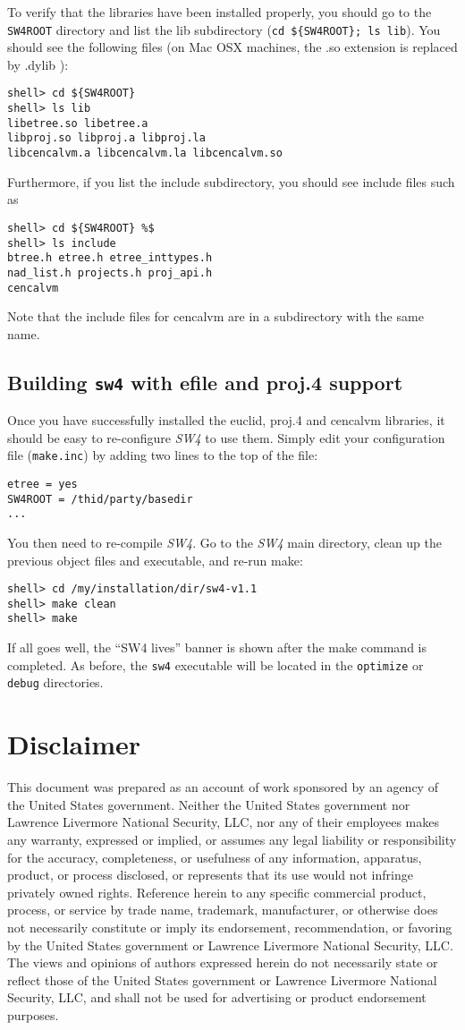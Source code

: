 \documentclass[11pt]{article}
\begin{document}
To verify that the libraries have been installed properly, you should go to the \verb+SW4ROOT+ directory
and list the lib subdirectory (\verb+cd ${SW4ROOT}; ls lib+). You should see the following files (on
Mac OSX machines, the .so extension is replaced by .dylib ):
\begin{verbatim}
shell> cd ${SW4ROOT}
shell> ls lib
libetree.so libetree.a 
libproj.so libproj.a libproj.la 
libcencalvm.a libcencalvm.la libcencalvm.so 
\end{verbatim}
Furthermore, if you list the include subdirectory, you should see include files such as 
\begin{verbatim}
shell> cd ${SW4ROOT} %$
shell> ls include
btree.h etree.h etree_inttypes.h
nad_list.h projects.h proj_api.h
cencalvm
\end{verbatim}
Note that the include files for cencalvm are in a subdirectory with the same name.

\subsection{Building {\tt sw4} with efile and proj.4 support}
Once you have successfully installed the euclid, proj.4 and cencalvm libraries, it should be easy to
re-configure \emph{SW4} to use them. Simply edit your configuration file (\verb+make.inc+)
by adding two lines to the top of the file:
\begin{verbatim}
etree = yes
SW4ROOT = /thid/party/basedir
...
\end{verbatim}
You then need to re-compile \emph{SW4}. Go to the \emph{SW4} main directory, clean up the previous object
files and executable, and re-run make:
\begin{verbatim}
shell> cd /my/installation/dir/sw4-v1.1
shell> make clean
shell> make
\end{verbatim}
If all goes well, the ``SW4 lives'' banner is shown after the make command is
completed. As before, the \verb+sw4+ executable will be located in the \verb+optimize+ or
\verb+debug+ directories.

\section{Disclaimer} 
This document was prepared as an account of work sponsored by an agency of the United States
government. Neither the United States government nor Lawrence Livermore National Security, LLC, nor
any of their employees makes any warranty, expressed or implied, or assumes any legal liability or
responsibility for the accuracy, completeness, or usefulness of any information, apparatus, product,
or process disclosed, or represents that its use would not infringe privately owned
rights. Reference herein to any specific commercial product, process, or service by trade name,
trademark, manufacturer, or otherwise does not necessarily constitute or imply its endorsement,
recommendation, or favoring by the United States government or Lawrence Livermore National Security,
LLC. The views and opinions of authors expressed herein do not necessarily state or reflect those of
the United States government or Lawrence Livermore National Security, LLC, and shall not be used for
advertising or product endorsement purposes. 



 
\end{document}
